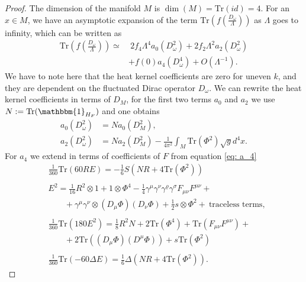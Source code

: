 \begin{proof}
     The dimension of the manifold $M$ is $\dim(M) = \text{Tr}(id) =4$. For
     an $x \in M$, we have an asymptotic expansion of the term
     $\text{Tr}(f(\frac{D_\omega}{\Lambda}))$ as $\Lambda$ goes to infinity,
     which can be written as
     \begin{align}
         \text{Tr}(f(\frac{D_\omega}{\Lambda})) \simeq& \ 2f_4 \Lambda ^4
         a_0(D_\omega ^2)+ 2f_2\Lambda^2 a_2(D_\omega^2)\nonumber \\&+ f(0) a_4(D_\omega^4)
         +O(\Lambda^{-1}).\label{eq:trheatkernel}
     \end{align}
     We have to note here that the heat kernel coefficients are zero for uneven $k$,
     and they are dependent on the fluctuated Dirac operator
     $D_\omega$. We can rewrite the heat kernel coefficients in terms of $D_M$,
     for the first two terms $a_0$ and $a_2$ we use $N:=
     \text{Tr}(\mathbbm{1}_{H_F})$ and one obtains
     \begin{align}
         a_0(D_\omega^2) &= Na_0(D_M^2),\\
         a_2(D_\omega^2) &= Na_2(D_M^2) - \frac{1}{4\pi^2}\int_M
         \text{Tr}(\Phi^2)\sqrt{g}d^4x.
     \end{align}
     For $a_4$ we extend in terms of coefficients of $F$ from equation
     \eqref{eq: a_4}
     \begin{align}
         &\frac{1}{360}\text{Tr}(60RE)= -\frac{1}{6}S(NR + 4
         \text{Tr}(\Phi^2))\\
        \nonumber\\
         &E^2 = \frac{1}{16}R^2\otimes 1 + 1\otimes \Phi^4 - \frac{1}{4}
         \gamma^\mu\gamma^\nu \gamma^\varrho\gamma^\sigma
         F_{\mu\nu}F^{\mu\nu}+\nonumber\\
         &\;\;\;\;\;\;\;+\gamma^\mu\gamma^\nu\otimes(D_\mu\Phi)(D_\nu
         \Phi)+\frac{1}{2}s\otimes \Phi^2 + \ \text{traceless terms},\\
         \nonumber\\
         &\frac{1}{360}\text{Tr}(180E^2) = \frac{1}{8}R^2N + 2\text{Tr}(\Phi^4)
         + \text{Tr}(F_{\mu\nu}F^{\mu\nu}) +\nonumber\\
         &\;\;\;\;\;\;\;+2\text{Tr}((D_\mu\Phi)(D^\mu\Phi))
         + s\text{Tr}(\Phi^2)\\
         \nonumber\\
         &\frac{1}{360}\text{Tr}(-60\Delta E)=
         \frac{1}{6}\Delta(NR+4\text{Tr}(\Phi^2)).
     \end{align}

\end{proof}
